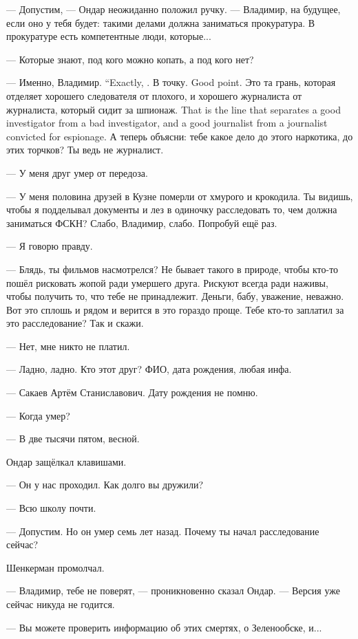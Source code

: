 --- Допустим, --- Ондар неожиданно положил ручку.
--- Владимир, на будущее, если оно у тебя будет: такими делами должна заниматься прокуратура.
В прокуратуре есть компетентные люди, которые...

--- Которые знают, под кого можно копать, а под кого нет?

{--- Именно, Владимир.}
{``Exactly, \Vladimir.}
{В точку.}
{Good point.}
{Это та грань, которая отделяет хорошего следователя от плохого, и хорошего журналиста от журналиста, который сидит за шпионаж.}
{That is the line that separates a good investigator from a bad investigator, and a good journalist from a journalist convicted for espionage.}
А теперь объясни: тебе какое дело до этого наркотика, до этих торчков?
Ты ведь не журналист.

--- У меня друг умер от передоза.

--- У меня половина друзей в Кузне померли от хмурого и крокодила.
Ты видишь, чтобы я подделывал документы и лез в одиночку расследовать то, чем должна заниматься ФСКН?
Слабо, Владимир, слабо.
Попробуй ещё раз.

--- Я говорю правду.

--- Блядь, ты фильмов насмотрелся?
Не бывает такого в природе, чтобы кто-то пошёл рисковать жопой ради умершего друга.
Рискуют всегда ради наживы, чтобы получить то, что тебе не принадлежит.
Деньги, бабу, уважение, неважно.
Вот это сплошь и рядом и верится в это гораздо проще.
Тебе кто-то заплатил за это расследование?
Так и скажи.

--- Нет, мне никто не платил.

--- Ладно, ладно.
Кто этот друг?
ФИО, дата рождения, любая инфа.

--- Сакаев Артём Станиславович.
Дату рождения не помню.

--- Когда умер?

--- В две тысячи пятом, весной.

Ондар защёлкал клавишами.

--- Он у нас проходил.
Как долго вы дружили?

--- Всю школу почти.

--- Допустим.
Но он умер семь лет назад.
Почему ты начал расследование сейчас?

Шенкерман промолчал.

--- Владимир, тебе не поверят, --- проникновенно сказал Ондар.
--- Версия уже сейчас никуда не годится.

--- Вы можете проверить информацию об этих смертях, о Зеленообске, и...

